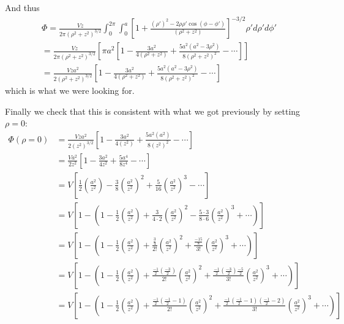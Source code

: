 \documentclass{article}
\begin{document}
And thus
\begin{multline*}
\Phi = \frac{Vz}{2\pi(\rho^{2} + z^{2})^{3/2}} \int_{0}^{2\pi}\int_{0}^{a} \left[1 + \frac{(\rho')^{2} - 2\rho\rho'\cos(\phi-\phi')}{(\rho^{2} + z^{2})}\right]^{-3/2}\rho' d\rho'd\phi'\\
= \frac{Vz}{2\pi(\rho^{2} + z^{2})^{3/2}}\left[ \pi a^{2} \left[ 1 - \frac{3a^{2}}{4(\rho^{2} + z^{2})} + \frac{5a^{2}(a^{2} - 3\rho^{2})}{8(\rho^{2} + z^{2})^{2}} - \cdots \right] \right]\\
= \boxed{\frac{Vza^{2}}{2(\rho^{2} + z^{2})^{3/2}}\left[ 1 - \frac{3a^{2}}{4(\rho^{2} + z^{2})} + \frac{5a^{2}(a^{2} - 3\rho^{2})}{8(\rho^{2} + z^{2})^{2}} - \cdots \right]}
\end{multline*}
which is what we were looking for.

Finally we check that this is consistent with what we got previously by setting $\rho=0$:
\begin{align*}
\Phi(\rho=0) &= \frac{Vza^{2}}{2(z^{2})^{3/2}}\left[ 1 - \frac{3a^{2}}{4(z^{2})} + \frac{5a^{2}(a^{2})}{8(z^{2})^{2}} - \cdots \right]\\
&= \frac{Va^{2}}{2z^{2}}\left[ 1 - \frac{3a^{2}}{4z^{2}} + \frac{5a^{4}}{8z^{4}} - \cdots \right]\\
&= V\left[ \frac{1}{2}\left(\frac{a^{2}}{z^{2}}\right) - \frac{3}{8}\left(\frac{a^{2}}{z^{2}}\right)^{2} + \frac{5}{16}\left(\frac{a^{2}}{z^{2}}\right)^{3} - \cdots \right]\\
&= V\left[ 1 - \left( 1 - \frac{1}{2}\left(\frac{a^{2}}{z^{2}}\right) + \frac{3}{4\cdot2}\left(\frac{a^{2}}{z^{2}}\right)^{2} - \frac{5\cdot3}{8\cdot6}\left(\frac{a^{2}}{z^{2}}\right)^{3} + \cdots \right)\right]\\
&= V\left[ 1 - \left( 1 - \frac{1}{2} \left(\frac{a^{2}}{z^{2}}\right) + \frac{\frac{3}{4}}{2!} \left(\frac{a^{2}}{z^{2}}\right)^{2} + \frac{\frac{-15}{8}}{3!} \left(\frac{a^{2}}{z^{2}}\right)^{3} + \cdots \right)\right]\\
&= V\left[ 1 - \left( 1 - \frac{1}{2} \left(\frac{a^{2}}{z^{2}}\right) + \frac{\frac{-1}{2}(\frac{-3}{2})}{2!} \left(\frac{a^{2}}{z^{2}}\right)^{2} + \frac{\frac{-1}{2}(\frac{-3}{2})\frac{-5}{2}}{3!} \left(\frac{a^{2}}{z^{2}}\right)^{3} + \cdots \right)\right]\\
&= V\left[ 1 - \left( 1 - \frac{1}{2} \left(\frac{a^{2}}{z^{2}}\right) + \frac{\frac{-1}{2}(\frac{-1}{2}-1)}{2!} \left(\frac{a^{2}}{z^{2}}\right)^{2} + \frac{\frac{-1}{2}(\frac{-1}{2}-1)(\frac{-1}{2}-2)}{3!}\left(\frac{a^{2}}{z^{2}}\right)^{3} + \cdots \right)\right]
\end{align*}
\end{document}
